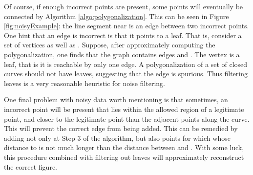 \documentclass{article}
\numberwithin{cntr}{section}
\numberwithin{equation}{section}
\begin{document}
Of course, if enough incorrect points are present, some points will
eventually be connected by Algorithm \ref{algo:polygonalization}.
This can be seen in Figure \ref{fig:noisyExample}:
the line segment near  is an edge between two incorrect points.
One hint that an edge is incorrect is that it points to a leaf.
That is, consider a set of vertices 
as well as . Suppose, after approximately computing the
polygonalization, one finds that the graph contains edges
 and . The vertex  is
a leaf, that is it is reachable by only one edge. A polygonalization
of a set of closed curves should not have leaves, suggesting that the
edge  is spurious.
Thus filtering leaves is a very reasonable heuristic for noise filtering.

One final problem with noisy data worth mentioning is that sometimes,
an incorrect point will be present that lies within the allowed
region of a legitimate point, and closer to the legitimate point
than the adjacent points along the curve. This will prevent the
correct edge from being added. This can be remedied by adding not
only  at Step 3 of the algorithm, but also points for
which  whose distance to  is not
much longer than the distance between  and .
With some luck, this procedure combined with filtering out leaves
will approximately reconstruct the correct figure.

\vspace{.2in}
\end{document}
